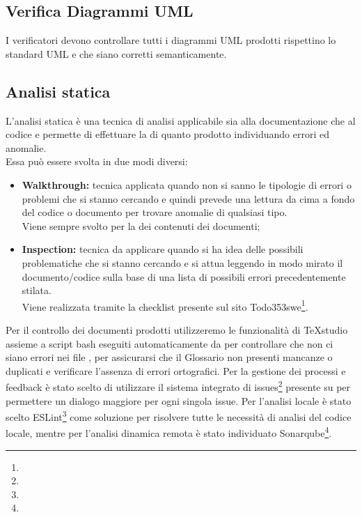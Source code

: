 \documentclass[NormeDiProgetto.tex]{subfiles}
\begin{document}
	\subsection{Verifica Diagrammi UML}
	I verificatori devono controllare tutti i diagrammi UML prodotti rispettino lo standard UML e che siano corretti semanticamente.
	
	\subsection{Analisi statica}
	L'analisi statica è una tecnica di analisi applicabile sia alla documentazione che al codice e permette di effettuare la  di quanto prodotto individuando errori ed anomalie.\\
	Essa può essere svolta in due modi diversi:
		\begin{itemize}
			\item \textbf{Walkthrough:} tecnica applicata quando non si sanno le tipologie di errori o problemi che si stanno cercando e quindi prevede una lettura da cima a fondo del codice o documento per trovare anomalie di qualsiasi tipo.\\
			Viene sempre svolto per la  dei contenuti dei documenti;
						
			\item \textbf{Inspection:} tecnica da applicare quando si ha idea delle possibili problematiche che si stanno cercando e si attua leggendo in modo mirato il documento/codice sulla base di una lista di possibili errori precedentemente stilata.\\
			Viene realizzata tramite la checklist presente sul sito Todo353swe\footnote{}.
		\end{itemize}
	
	Per il controllo dei documenti prodotti utilizzeremo le funzionalità di TeXstudio assieme a script bash eseguiti automaticamente da  per controllare che non ci siano errori nei file , per assicurarsi che il Glossario non presenti mancanze o duplicati e verificare l'assenza di errori ortografici.
	Per la gestione dei processi e feedback è stato scelto di utilizzare il sistema integrato di issues\footnote{} presente su  per permettere un dialogo maggiore per ogni singola issue.
	Per l'analisi locale è stato scelto ESLint\footnote{} come soluzione per risolvere tutte le necessità di analisi del codice locale, mentre per l'analisi dinamica remota è stato individuato Sonarqube\footnote{}.
	
\end{document}
